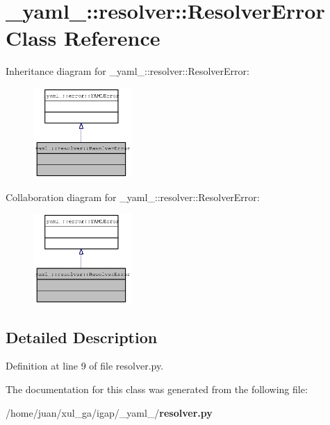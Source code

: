 \section{\_\-yaml\_\-::resolver::ResolverError Class Reference}
\label{class__yaml___1_1resolver_1_1ResolverError}
Inheritance diagram for \_\-yaml\_\-::resolver::ResolverError:\nopagebreak
\begin{figure}[H]
\begin{center}
\leavevmode
\includegraphics[width=106pt]{class__yaml___1_1resolver_1_1ResolverError__inherit__graph}
\end{center}
\end{figure}
Collaboration diagram for \_\-yaml\_\-::resolver::ResolverError:\nopagebreak
\begin{figure}[H]
\begin{center}
\leavevmode
\includegraphics[width=106pt]{class__yaml___1_1resolver_1_1ResolverError__coll__graph}
\end{center}
\end{figure}


\subsection{Detailed Description}


Definition at line 9 of file resolver.py.

The documentation for this class was generated from the following file:\begin{CompactItemize}
\item 
/home/juan/xul\_\-ga/igap/\_\-yaml\_\-/{\bf resolver.py}\end{CompactItemize}
